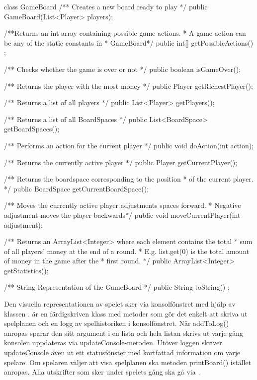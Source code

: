 \begin{JavaSpec}{class GameBoard}
    /** Creates a new board ready to play */
    public GameBoard(List<Player> players);

    /**Returns an int array containing possible game actions.
     * A game action can be any of the static constants in
     * GameBoard*/
    public int[] getPossibleActions() ;
    
    /** Checks whether the game is over or not */
    public boolean isGameOver();
    
    /** Returns the player with the most money */
    public Player getRichestPlayer();

    /** Returns a list of all players */
    public List<Player> getPlayers();

    /** Returns a list of all BoardSpaces */
    public List<BoardSpace> getBoardSpaces();

    /** Performs an action for the current player */
    public void doAction(int action);
 
    /** Returns the currently active player */
    public Player getCurrentPlayer();

    /** Returns the boardspace corresponding to the position 
      * of the current player. */
    public BoardSpace getCurrentBoardSpace();

    /** Moves the currently active player adjustments spaces forward.
      * Negative adjustment moves the player backwards*/
    public void moveCurrentPlayer(int adjustment);
    
    /** Returns an ArrayList<Integer> where each element contains the total
      * sum of all players' money at the end of a round.
      * E.g. list.get(0) is the total amount of money in the game after the 
      * first round. */
    public ArrayList<Integer> getStatistics();

    /** String Representation of the GameBoard */
    public String toString() ;
\end{JavaSpec}


Den visuella representationen av spelet sker via konsolfönstret med hjälp av klassen .  är en färdigskriven klass med metoder som gör det enkelt att skriva ut spelplanen och en logg av spelhistoriken i konsolfönstret.
 När addToLog() anropas sparar den sitt argument i en lista och hela listan skrivs ut varje gång konsolen uppdateras via updateConsole-metoden.
Utöver loggen skriver updateConsole även ut ett statusfönster med kortfattad information om varje spelare. 
Om spelaren väljer att visa spelplanen ska metoden printBoard() istället anropas.
Alla utskrifter som sker under spelets gång ska gå via .
\newline

